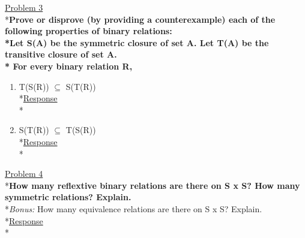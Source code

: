 \documentclass[12pt]{article}
\begin{document}
\medskip
\uline{Problem 3}
\\*\textbf{Prove or disprove (by providing a counterexample) each of the following properties of binary relations:
\\*Let S(A) be the symmetric closure of set A. Let T(A) be the transitive closure of set A.
\\* For every binary relation R,}
\begin{enumerate}
\item T(S(R)) $\subseteq$ S(T(R))
\smallskip
\\*\uline{Response}
\\*
\item S(T(R)) $\subseteq$ T(S(R))
\smallskip
\\*\uline{Response}
\\*
\end{enumerate}
\medskip
\uline{Problem 4}
\\*\textbf{How many reflextive binary relations are there on S x S? How many symmetric relations? Explain.}
\\*\textit{Bonus:} How many equivalence relations are there on S x S? Explain.
\smallskip
\\*\uline{Response}
\\*
\end{document}
